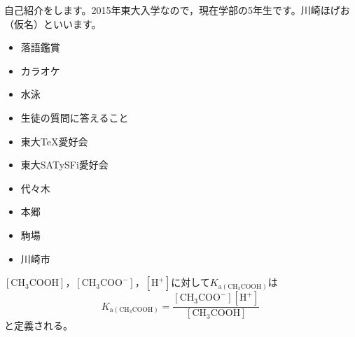 \documentclass[a4paper,uplatex]{jsarticle}
\begin{document}
自己紹介をします。2015年東大入学なので，現在学部の5年生です。川崎ほげお（仮名）といいます。

\vskip13pt
\begin{itemize}
\item 落語鑑賞
\item カラオケ
\item 水泳
\item 生徒の質問に答えること
\end{itemize}

\vskip13pt
\begin{itemize}
\item 東大\TeX 愛好会
\item 東大SATySFi愛好会
\end{itemize}

\vskip13pt
\begin{itemize}
\item 代々木
\item 本郷
\item 駒場
\item 川崎市
\end{itemize}

\vskip13pt

$\left[\mathrm{CH_3COOH}\right]$，$\left[\mathrm{CH_3COO^-}\right]$，$\left[\mathrm{H^+}\right]$に対して$K_{\mathrm{a(CH_3COOH)}}$は
\[
K_{\mathrm{a(CH_3COOH)}}=\frac{\left[\mathrm{CH_3COO^-}\right]\left[\mathrm{H^+}\right]}{\left[\mathrm{CH_3COOH}\right]}
\]
と定義される。
\end{document}
